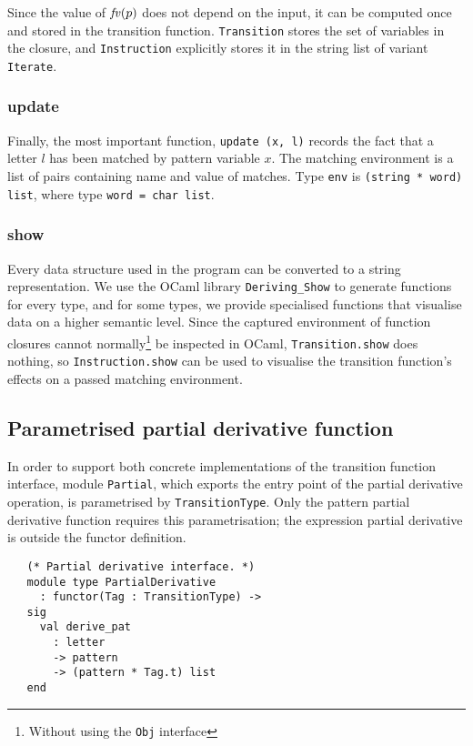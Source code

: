 Since the value of $\mathit{fv}(p)$ does not depend on the input, it can be computed
once and stored in the transition function. \texttt{Transition} stores the set
of variables in the closure, and \texttt{Instruction} explicitly stores it in
the string list of variant \texttt{Iterate}.


\subsubsection{update}

Finally, the most important function, \texttt{update (x, l)} records the fact
that a letter $l$ has been matched by pattern variable $x$. The matching
environment is a list of pairs containing name and value of matches. Type
\texttt{env} is \texttt{(string * word) list}, where type \texttt{word = char
list}.


\subsubsection{show}

Every data structure used in the program can be converted to a string
representation. We use the OCaml library \texttt{Deriving\_Show} to generate
functions for every type, and for some types, we provide specialised functions
that visualise data on a higher semantic level. Since the captured environment
of function closures cannot normally\footnote{Without using the \texttt{Obj}
interface} be inspected in OCaml, \texttt{Transition.show} does nothing, so
\texttt{Instruction.show} can be used to visualise the transition function's
effects on a passed matching environment.


\subsection{Parametrised partial derivative function}

In order to support both concrete implementations of the transition function
interface, module \texttt{Partial}, which exports the entry point of the partial
derivative operation, is parametrised by \texttt{TransitionType}. Only the
pattern partial derivative function requires this parametrisation; the
expression partial derivative is outside the functor definition.

\needspace{3cm}
\begin{lstlisting}
   (* Partial derivative interface. *)
   module type PartialDerivative
     : functor(Tag : TransitionType) ->
   sig
     val derive_pat
       : letter
       -> pattern
       -> (pattern * Tag.t) list
   end
\end{lstlisting}


